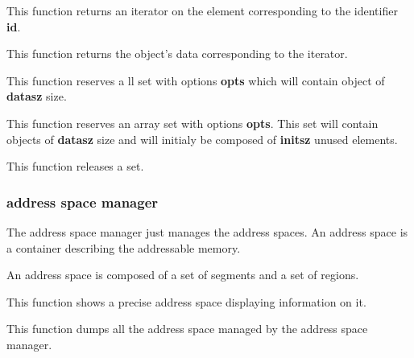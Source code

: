 This function returns an iterator on the element corresponding to the
identifier \textbf{id}.


This function returns the object's data corresponding to the iterator.


This function reserves a ll set with options \textbf{opts} which will contain
object of \textbf{datasz} size.


This function reserves an array set with options \textbf{opts}. This
set will contain objects of \textbf{datasz} size and will initialy
be composed of \textbf{initsz} unused elements.


This function releases a set.

%
%

\subsubsection{address space manager}

The address space manager just manages the address spaces. An address
space is a container describing the addressable memory.

An address space is composed of a set of segments and a set of regions.


This function shows a precise address space displaying information
on it.


This function dumps all the address space managed by the address
space manager.

